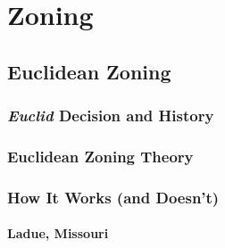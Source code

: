 \chapter{Zoning}



\section{Euclidean Zoning}

\subsection{\textit{Euclid} Decision and History}







\begin{questions}

\end{questions}


\subsection{Euclidean Zoning Theory}




\subsection{How It Works (and Doesn't)} 





\begin{questions}

\end{questions}


\subsubsection{Ladue, Missouri}







\begin{questions}

\end{questions}


